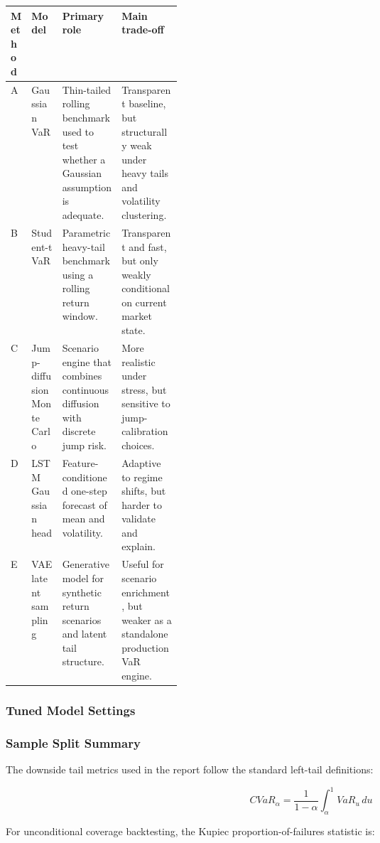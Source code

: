\begingroup
\small
\setlength{\tabcolsep}{4pt}
\begin{center}
\begin{tabularx}{0.98\linewidth}{@{}>{\RaggedRight\arraybackslash}p{0.10\linewidth}>{\RaggedRight\arraybackslash}p{0.18\linewidth}>{\RaggedRight\arraybackslash}X>{\RaggedRight\arraybackslash}X@{}}
\toprule
Method & Model & Primary role & Main trade-off \\
\midrule
A & Gaussian VaR & Thin-tailed rolling benchmark used to test whether a Gaussian assumption is adequate. & Transparent baseline, but structurally weak under heavy tails and volatility clustering. \\
B & Student-t VaR & Parametric heavy-tail benchmark using a rolling return window. & Transparent and fast, but only weakly conditional on current market state. \\
C & Jump-diffusion Monte Carlo & Scenario engine that combines continuous diffusion with discrete jump risk. & More realistic under stress, but sensitive to jump-calibration choices. \\
D & LSTM Gaussian head & Feature-conditioned one-step forecast of mean and volatility. & Adaptive to regime shifts, but harder to validate and explain. \\
E & VAE latent sampling & Generative model for synthetic return scenarios and latent tail structure. & Useful for scenario enrichment, but weaker as a standalone production VaR engine. \\
\bottomrule
\end{tabularx}
\end{center}
\endgroup

\subsubsection*{Tuned Model Settings}



\subsubsection*{Sample Split Summary}



The downside tail metrics used in the report follow the standard left-tail definitions:

\[
CVaR_{\alpha} = \frac{1}{1-\alpha} \int_{\alpha}^{1} VaR_u \, du
\]

For unconditional coverage backtesting, the Kupiec proportion-of-failures statistic is:

